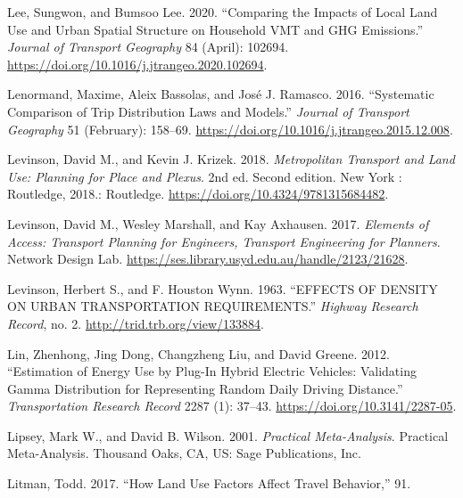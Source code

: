 \documentclass[
  11pt,
  openany]{memoir}
\newlength{\cslhangindent}
\newlength{\cslentryspacingunit} %
\newenvironment{CSLReferences}[2] %
 {%
  \setlength{\parindent}{0pt}
  \ifodd #1
  \let\oldpar\par
  \def\par{\hangindent=\cslhangindent\oldpar}
  \fi
  \setlength{\parskip}{#2\cslentryspacingunit}
 }%
 {}
\begin{document}
\begin{CSLReferences}{1}{0}
\leavevmode{}%
Lee, Sungwon, and Bumsoo Lee. 2020. {``Comparing the Impacts of Local Land Use and Urban Spatial Structure on Household {VMT} and {GHG} Emissions.''} \emph{Journal of Transport Geography} 84 (April): 102694. \url{https://doi.org/10.1016/j.jtrangeo.2020.102694}.

\leavevmode{}%
Lenormand, Maxime, Aleix Bassolas, and José J. Ramasco. 2016. {``Systematic Comparison of Trip Distribution Laws and Models.''} \emph{Journal of Transport Geography} 51 (February): 158--69. \url{https://doi.org/10.1016/j.jtrangeo.2015.12.008}.

\leavevmode{}%
Levinson, David M., and Kevin J. Krizek. 2018. \emph{Metropolitan {Transport} and {Land Use}: Planning for {Place} and {Plexus}}. 2nd ed. {Second edition. \textbar{} New York : Routledge, 2018.}: {Routledge}. \url{https://doi.org/10.4324/9781315684482}.

\leavevmode{}%
Levinson, David M., Wesley Marshall, and Kay Axhausen. 2017. \emph{Elements of {Access}: Transport {Planning} for {Engineers}, {Transport Engineering} for {Planners}}. {Network Design Lab}. \url{https://ses.library.usyd.edu.au/handle/2123/21628}.

\leavevmode{}%
Levinson, Herbert S., and F. Houston Wynn. 1963. {``{EFFECTS OF DENSITY ON URBAN TRANSPORTATION REQUIREMENTS}.''} \emph{Highway Research Record}, no. 2. \url{http://trid.trb.org/view/133884}.

\leavevmode{}%
Lin, Zhenhong, Jing Dong, Changzheng Liu, and David Greene. 2012. {``Estimation of {Energy Use} by {Plug}-{In Hybrid Electric Vehicles}: Validating {Gamma Distribution} for {Representing Random Daily Driving Distance}.''} \emph{Transportation Research Record} 2287 (1): 37--43. \url{https://doi.org/10.3141/2287-05}.

\leavevmode{}%
Lipsey, Mark W., and David B. Wilson. 2001. \emph{Practical Meta-Analysis}. Practical Meta-Analysis. {Thousand Oaks, CA, US}: {Sage Publications, Inc}.

\leavevmode{}%
Litman, Todd. 2017. {``How {Land Use Factors Affect Travel Behavior},''} 91.


\end{CSLReferences}
\end{document}
